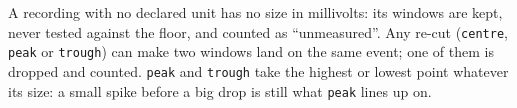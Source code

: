 A recording with no declared unit has no size in millivolts: its windows are kept, never
tested against the floor, and counted as ``unmeasured''. Any re-cut (\texttt{centre}, \texttt{peak} or \texttt{trough}) can
make two windows land on the same event; one of them is dropped and counted. \texttt{peak} and
\texttt{trough} take the highest or lowest point whatever its size: a small spike before a big
drop is still what \texttt{peak} lines up on.
